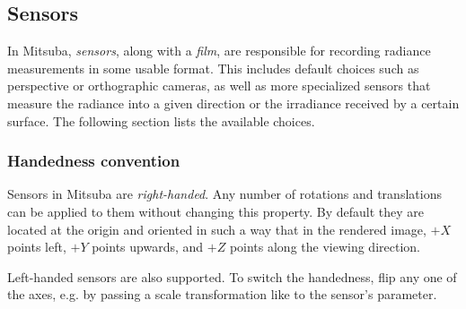 \newpage
\subsection{Sensors}
\label{sec:sensors}
In Mitsuba, \emph{sensors}, along with a \emph{film}, are responsible for recording radiance
measurements in some usable format. This includes default choices such as perspective
or orthographic cameras, as well as more specialized sensors that measure the radiance
into a given direction or the irradiance received by a certain surface. The following
section lists the available choices.

\subsubsection*{Handedness convention}
Sensors in Mitsuba are \emph{right-handed}.
Any number of rotations and translations can be applied to them
without changing this property. By default they are located at the
origin and oriented in such a way that in the rendered image, $+X$ points left,
$+Y$ points upwards, and $+Z$ points along the viewing direction.

Left-handed sensors are also supported. To switch the handedness,
flip any one of the axes, e.g. by passing a scale transformation like
 to the sensor's  parameter.

